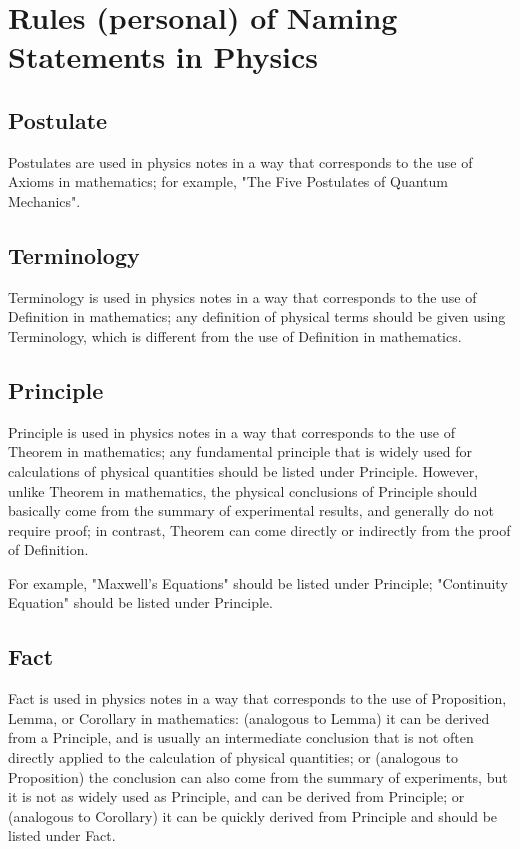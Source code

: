 \documentclass[oneside,10pt]{book}
\begin{document}
\section{Rules (personal) of Naming Statements in Physics}
\subsection{Postulate}
Postulates are used in physics notes in a way that corresponds to the use of Axioms in mathematics; for example, "The Five Postulates of Quantum Mechanics".

\subsection{Terminology}
Terminology is used in physics notes in a way that corresponds to the use of Definition in mathematics; any definition of physical terms should be given using Terminology, which is different from the use of Definition in mathematics.

\subsection{Principle}
Principle is used in physics notes in a way that corresponds to the use of Theorem in mathematics; any fundamental principle that is widely used for calculations of physical quantities should be listed under Principle. However, unlike Theorem in mathematics, the physical conclusions of Principle should basically come from the summary of experimental results, and generally do not require proof; in contrast, Theorem can come directly or indirectly from the proof of Definition.

For example, "Maxwell's Equations" should be listed under Principle; "Continuity Equation" should be listed under Principle.

\subsection{Fact}
 Fact is used in physics notes in a way that corresponds to the use of Proposition, Lemma, or Corollary in mathematics: (analogous to Lemma) it can be derived from a Principle, and is usually an intermediate conclusion that is not often directly applied to the calculation of physical quantities; or (analogous to Proposition) the conclusion can also come from the summary of experiments, but it is not as widely used as Principle, and can be derived from Principle; or (analogous to Corollary) it can be quickly derived from Principle and should be listed under Fact.
\end{document}
